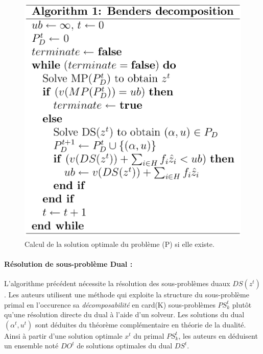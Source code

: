 \begin{figure}[H]
	\begin{center}	
		\includegraphics[scale=0.3]{images/alg1}
		\caption{Calcul de la solution optimale du problème (P) si elle existe.}
		\label{alg1}
	\end{center}
\end{figure}


  \paragraph{Résolution de sous-problème Dual :}

L'algorithme précédent nécessite la résolution des sous-problèmes duaux $DS(z^t)$. Les auteurs utilisent une méthode qui exploite la structure du sous-problème primal en l'occurence sa \textit{décomposabilité} en card(K) sous-problèmes $PS^t_k $ plutôt qu'une résolution directe du dual à l'aide d'un solveur. Les solutions du dual $(\alpha^t, u^t)$ sont déduites du théorème complémentaire en théorie de la dualité. Ainsi à partir d'une solution optimale $x^t$ du primal $PS^t_k$, les auteurs en déduisent un ensemble noté $DO^t$ de solutions optimales du dual $DS^t$.

